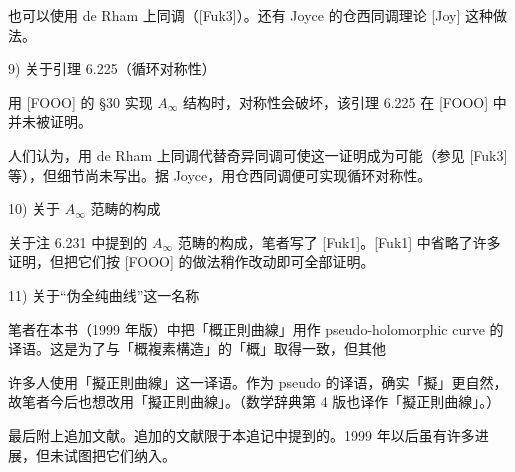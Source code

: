 也可以使用 de Rham 上同调（[Fuk3]）。还有 Joyce 的仓西同调理论 [Joy] 这种做法。

9) 关于引理 6.225（循环对称性）

用 [FOOO] 的 §30 实现 $A_\infty$ 结构时，对称性会破坏，该引理 6.225 在 [FOOO] 中并未被证明。

人们认为，用 de Rham 上同调代替奇异同调可使这一证明成为可能（参见 [Fuk3] 等），但细节尚未写出。据 Joyce，用仓西同调便可实现循环对称性。

10) 关于 $A_\infty$ 范畴的构成

关于注 6.231 中提到的 $A_\infty$ 范畴的构成，笔者写了 [Fuk1]。[Fuk1] 中省略了许多证明，但把它们按 [FOOO] 的做法稍作改动即可全部证明。

11) 关于“伪全纯曲线”这一名称

笔者在本书（1999 年版）中把「概正則曲線」用作 pseudo-holomorphic curve 的译语。这是为了与「概複素構造」的「概」取得一致，但其他

许多人使用「擬正則曲線」这一译语。作为 pseudo 的译语，确实「擬」更自然，故笔者今后也想改用「擬正則曲線」。（数学辞典第 4 版也译作「擬正則曲線」。）


最后附上追加文献。追加的文献限于本追记中提到的。1999 年以后虽有许多进展，但未试图把它们纳入。

